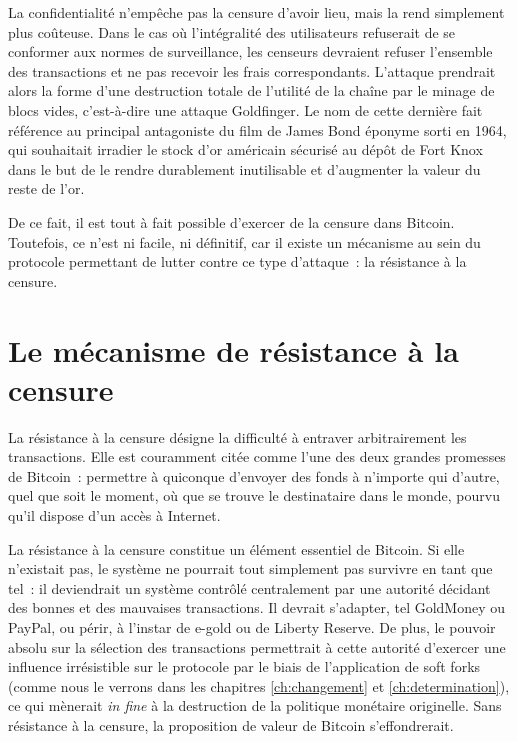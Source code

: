 La confidentialité n'empêche pas la censure d'avoir lieu, mais la rend simplement plus coûteuse. Dans le cas où l'intégralité des utilisateurs refuserait de se conformer aux normes de surveillance, les censeurs devraient refuser l'ensemble des transactions et ne pas recevoir les frais correspondants. L'attaque prendrait alors la forme d'une destruction totale de l'utilité de la chaîne par le minage de blocs vides, c'est-à-dire une attaque Goldfinger. Le nom de cette dernière fait référence au principal antagoniste du film de James Bond éponyme sorti en 1964, qui souhaitait irradier le stock d'or américain sécurisé au dépôt de Fort Knox dans le but de le rendre durablement inutilisable et d'augmenter la valeur du reste de l'or.

\clearpage
De ce fait, il est tout à fait possible d'exercer de la censure dans Bitcoin. Toutefois, ce n'est ni facile, ni définitif, car il existe un mécanisme au sein du protocole permettant de lutter contre ce type d'attaque~: la résistance à la censure.

\section*{Le mécanisme de résistance à la censure}

La résistance à la censure désigne la difficulté à entraver arbitrairement les transactions. Elle est couramment citée comme l'une des deux grandes promesses de Bitcoin~: permettre à quiconque d'envoyer des fonds à n'importe qui d'autre, quel que soit le moment, où que se trouve le destinataire dans le monde, pourvu qu'il dispose d'un accès à Internet.

La résistance à la censure constitue un élément essentiel de Bitcoin. Si elle n'existait pas, le système ne pourrait tout simplement pas survivre en tant que tel~: il deviendrait un système contrôlé centralement par une autorité décidant des bonnes et des mauvaises transactions. Il devrait s'adapter, tel GoldMoney ou PayPal, ou périr, à l'instar de e-gold ou de Liberty Reserve. De plus, le pouvoir absolu sur la sélection des transactions permettrait à cette autorité d'exercer  une influence irrésistible sur le protocole par le biais de l'application de soft forks (comme nous le verrons dans les chapitres \ref{ch:changement} et \ref{ch:determination}), ce qui mènerait \emph{in fine} à la destruction de la politique monétaire originelle. Sans résistance à la censure, la proposition de valeur de Bitcoin s'effondrerait.

